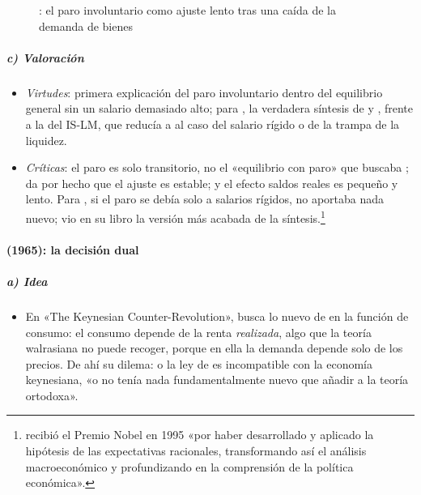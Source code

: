 \documentclass[11pt]{article}
\begin{document}
\begin{figure}[H]
\centering
\caption{: el paro involuntario como ajuste lento tras una caída de la demanda de bienes}\label{fig:patinkin}
\end{figure}

\subparagraph{c) Valoración}

\begin{itemize}
\item \emph{Virtudes}: primera explicación del paro involuntario dentro del equilibrio general sin un salario demasiado alto; para , la verdadera síntesis de  y , frente a la del IS-LM, que reducía a  al caso del salario rígido o de la trampa de la liquidez.
\item \emph{Críticas}: el paro es solo transitorio, no el «equilibrio con paro» que buscaba ; da por hecho que el ajuste es estable; y el efecto saldos reales es pequeño y lento\nocite{DeVroey2016History}. Para , si el paro se debía solo a salarios rígidos,  no aportaba nada nuevo; \textcite{Lucas1980Methods} vio en su libro la versión más acabada de la síntesis.\footnote{ recibió el Premio Nobel en 1995 «por haber desarrollado y aplicado la hipótesis de las expectativas racionales, transformando así el análisis macroeconómico y profundizando en la comprensión de la política económica»\nocite{NobelPrize1995Lucas}.}
\end{itemize}

\paragraph{ (1965): la decisión dual}

\subparagraph{a) Idea}

\begin{itemize}
\item En «The Keynesian Counter-Revolution», \textcite{Clower1965Keynesian} busca lo nuevo de  en la función de consumo: el consumo depende de la renta \emph{realizada}, algo que la teoría walrasiana no puede recoger, porque en ella la demanda depende solo de los precios. De ahí su dilema: o la ley de  es incompatible con la economía keynesiana, «o  no tenía nada fundamentalmente nuevo que añadir a la teoría ortodoxa»\nocite{Clower1965Keynesian}.
\end{itemize}
\end{document}
